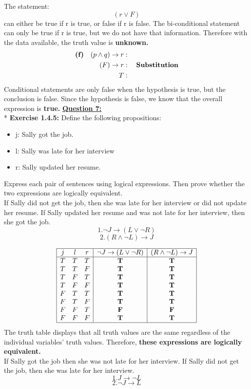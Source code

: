\documentclass[12pt, letterpaper, twoside]{article}
\begin{document}
The statement: \[(r \lor F)\] can either be true if r is true, or false if r is false. The bi-conditional statement can only be true if r is true, but we do not have that information. Therefore with the data available, the truth value is \textbf{unknown.}\\
\begin{align*}
\text{\textbf{(f)}} \quad (p \land q) \to r     &: \quad\\
(F) \to r     &: \quad \text{\textbf{Substitution}}\\
T     &: \quad\\
\end{align*}
Conditional statements are only false when the hypothesis is true, but the conclusion is false. Since the hypothesis is false, we know that the overall expression is \textbf{true.}
\newpage
\noindent \underline{\textbf{Question 7:}}\\*
\textbf{Exercise 1.4.5:}
Define the following propositions:
\begin{itemize}
\item j: Sally got the job.
\item l: Sally was late for her interview
\item r: Sally updated her resume.
\end{itemize}
Express each pair of sentences using logical expressions. Then prove whether the two expressions are logically equivalent.\\
\break
\noindent {}\quad If Sally did not get the job, then she was late for her interview or did not update her resume.
If Sally updated her resume and was not late for her interview, then she got the job.
\[1. \neg{J} \to (L \lor \neg{R})\]
\[2. (R \land \neg{L}) \to J\]

\begin{displaymath}
\begin{array}{|c c c|c|c|}
\hline
j & l & r & \neg{J} \to (L \lor \neg{R}) & (R \land \neg{L}) \to J \\ 
\hline 
T & T & T & \textbf{T} & \textbf{T}\\
T & T & F & \textbf{T} & \textbf{T}\\
T & F & T & \textbf{T} & \textbf{T}\\
T & F & F & \textbf{T} & \textbf{T}\\
F & T & T & \textbf{T} & \textbf{T}\\
F & T & F & \textbf{T} & \textbf{T}\\
F & F & T & \textbf{F} & \textbf{F}\\
F & F & F & \textbf{T} & \textbf{T}\\
\hline
\end{array}
\end{displaymath}
\break
The truth table displays that all truth values are the same regardless of the individual variables’ truth values. Therefore, \textbf{these expressions are logically equivalent.}\\
\newpage
{}\quad If Sally got the job then she was not late for her interview.
If Sally did not get the job, then she was late for her interview.
\[1. J \to \neg{L}\]
\[2. \neg{J} \to L\]
\end{document}
